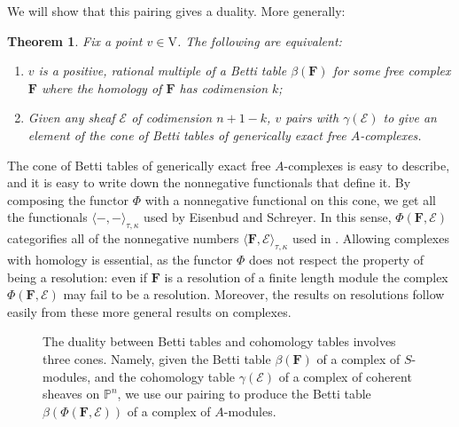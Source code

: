 \documentclass[12pt]{amsart}
\newtheorem{thm}[lemma]{Theorem}
\theoremstyle{definition}
\theoremstyle{remark}
\newcommand{\PP}{\mathbb{P}}
\newcommand{\VV}{\mathrm{V}}
\newcommand{\cE}{\mathcal{E}}
\newcommand{\FF}{\mathbf{F}}
\begin{document}
We will show that this pairing gives a duality. More generally: 
\begin{thm}\label{thm:duality}
Fix a point $v\in \VV$.   The following are equivalent:
\begin{enumerate}
	\item   $v$ is a positive, rational multiple of a Betti table $\beta(\FF)$ for some free complex $\FF$ where the homology of $\FF$ has codimension $k$;
	\item  Given any sheaf $\cE$ of codimension $n+1-k$, $v$ pairs with $\gamma(\cE)$ to give an element of the cone of Betti tables of generically exact free $A$-complexes.
\end{enumerate}
\end{thm}

The cone of Betti tables of generically exact free $A$-complexes is easy to describe, and it is easy to write down the nonnegative functionals that define it.
By composing the functor $\Phi$ with a nonnegative functional on this cone, we get all the functionals $\langle -,-\rangle_{\tau,\kappa}$ used by Eisenbud and Schreyer. In this sense, $\Phi(\FF,\cE)$ categorifies all of the nonnegative numbers $\langle \FF, \cE\rangle_{\tau,\kappa}$ used in \cite{eis-schrey1}. Allowing complexes with homology is essential, as the functor $\Phi$ does not respect the property of being a resolution: even if $\FF$ is a resolution of a finite length module the complex $\Phi(\FF,\cE)$ may fail to be a resolution. Moreover, the results on resolutions follow easily from these more general results on complexes.


\begin{figure}
\caption{The duality between Betti tables and cohomology tables involves three cones.  Namely, given the Betti table $\beta(\FF)$ of a complex of $S$-modules, and the cohomology table $\gamma(\cE)$ of a complex of coherent sheaves on $\PP^n$, we use our pairing to produce the Betti table $\beta(\Phi(\FF,\cE))$ of a complex of $A$-modules. 
}
\label{fig:bracket}
\end{figure}
\end{document}
